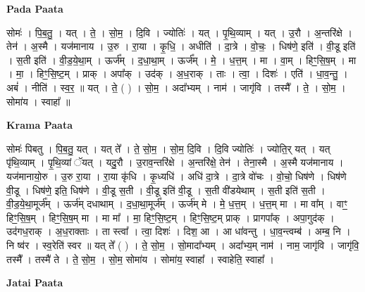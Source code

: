 \documentclass[17pt]{extarticle}
\begin{document}
\textbf{Pada Paata} \newline

सोमः॑ । पि॒ब॒तु॒ । यत् । ते॒ । सो॒म॒ । दि॒वि । ज्योतिः॑ । यत् । पृ॒थि॒व्याम् । यत् । उ॒रौ । अ॒न्तरि॑क्षे । तेन॑ । अ॒स्मै । यज॑मानाय । उ॒रु । रा॒या । कृ॒धि॒ । अधीति॑ । दा॒त्रे । वो॒चः॒ । धिष॑णे॒ इति॑ । वी॒डू इति॑ । स॒ती इति॑ । वी॒ड॒ये॒था॒म् । ऊर्ज᳚म् । द॒धा॒था॒म् । ऊर्ज᳚म् । मे॒ । ध॒त्त॒म् । मा । वा॒म् । हिꣳ॒॒॒सि॒ष॒म् । मा । मा॒ । हिꣳ॒॒सि॒ष्ट॒म् । प्राक् । अपा᳚क् । उद॑क् । अ॒ध॒राक् । ताः । त्वा॒ । दिशः॑ । एति॑ । धा॒व॒न्तु॒ । अबं॑ । नीति॑ । स्व॒र॒ ॥ यत् । ते॒ ( ) । सो॒म॒ । अदा᳚भ्यम् । नाम॑ । जागृ॑वि । तस्मै᳚ । ते॒ । सो॒म॒ । सोमा॑य । स्वाहा᳚ ॥  \newline


\textbf{Krama Paata} \newline

सोमः॑ पिबतु । पि॒ब॒तु॒ यत् । यत् ते᳚ । ते॒ सो॒म॒ । सो॒म॒ दि॒वि । दि॒वि ज्योतिः॑ । ज्योति॒र् यत् । यत् पृ॑थि॒व्याम् । पृ॒थि॒व्यां ॅयत् । यदु॒रौ । उ॒राव॒न्तरि॑क्षे । अ॒न्तरि॑क्षे॒ तेन॑ । तेना॒स्मै । अ॒स्मै यज॑मानाय । यज॑मानायो॒रु । उ॒रु रा॒या । रा॒या कृ॑धि । कृ॒ध्यधि॑ । अधि॑ दा॒त्रे । दा॒त्रे वो॑चः । वो॒चो॒ धिष॑णे । धिष॑णे वी॒डू । धिष॑णे॒ इति॒ धिष॑णे । वी॒डू स॒ती । वी॒डू इति॑ वी॒डू । स॒ती वी॑डयेथाम् । स॒ती इति॑ स॒ती । वी॒ड॒ये॒था॒मूर्ज᳚म् । ऊर्ज॑म् दधाथाम् । द॒धा॒था॒मूर्ज᳚म् । ऊर्ज॑म् मे । मे॒ ध॒त्त॒म् । ध॒त्त॒म् मा । मा वा᳚म् । वाꣳ॒॒ हिꣳ॒॒सि॒ष॒म् । हिꣳ॒॒सि॒ष॒म् मा । मा मा᳚ । मा॒ हिꣳ॒॒सि॒ष्ट॒म् । हिꣳ॒॒सि॒ष्ट॒म् प्राक् । प्रागपा᳚क् । अपा॒गुद॑क् । उद॑गध॒राक् । अ॒ध॒राक्ताः । ता स्त्वा᳚ । त्वा॒ दिशः॑ । दिश॒ आ । आ धा॑वन्तु । धा॒व॒न्त्वम्ब॑ । अम्ब॒ नि । नि ष्व॑र । स्व॒रेति॑ स्वर ॥ यत् ते᳚ ( ) । ते॒ सो॒म॒ । सो॒मादा᳚भ्यम् । अदा᳚भ्य॒म् नाम॑ । नाम॒ जागृ॑वि । जागृ॑वि॒ तस्मै᳚ । तस्मै॑ ते । ते॒ सो॒म॒ । सो॒म॒ सोमा॑य । सोमा॑य॒ स्वाहा᳚ । स्वाहेति॒ स्वाहा᳚ । \newline

\textbf{Jatai Paata} \newline
\end{document}

